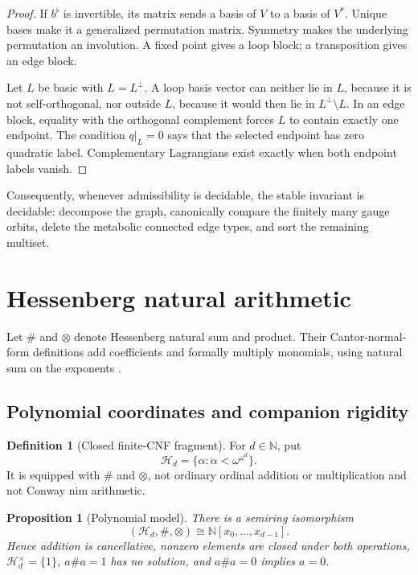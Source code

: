 \documentclass[11pt]{article}
\newtheorem{proposition}[theorem]{Proposition}
\theoremstyle{definition}
\newtheorem{definition}[theorem]{Definition}
\theoremstyle{remark}
\newcommand{\Nat}{\mathbb N}
\newcommand{\Hess}{\mathcal H}
\begin{document}
\begin{proof}
If \(b^\flat\) is invertible, its matrix sends a basis of \(V\) to a basis of
\(V^*\).  Unique bases make it a generalized permutation matrix.  Symmetry
makes the underlying permutation an involution.  A fixed point gives a loop
block; a transposition gives an edge block.

Let \(L\) be basic with \(L=L^\perp\).  A loop basis vector can neither lie in
\(L\), because it is not self-orthogonal, nor outside \(L\), because it would
then lie in \(L^\perp\setminus L\).  In an edge block, equality with the
orthogonal complement forces \(L\) to contain exactly one endpoint.  The
condition \(q|_L=0\) says that the selected endpoint has zero quadratic label.
Complementary Lagrangians exist exactly when both endpoint labels vanish.
\end{proof}

Consequently, whenever admissibility is decidable, the stable invariant is
decidable: decompose the graph, canonically compare the finitely many gauge
orbits, delete the metabolic connected edge types, and sort the remaining
multiset.

\section{Hessenberg natural arithmetic}\label{sec:hessenberg}

Let \(\#\) and \(\otimes\) denote Hessenberg natural sum and product.  Their
Cantor-normal-form definitions add coefficients and formally multiply
monomials, using natural sum on the exponents \cite{carruth1942}.

\subsection{Polynomial coordinates and companion rigidity}

\begin{definition}[Closed finite-CNF fragment]
For \(d\in\Nat\), put
\[
 \Hess_d=\{\alpha:\alpha<\omega^{\omega^d}\}.
\]
It is equipped with \(\#\) and \(\otimes\), not ordinary ordinal addition or
multiplication and not Conway nim arithmetic.
\end{definition}

\begin{proposition}[Polynomial model]\label{prop:polynomial}
There is a semiring isomorphism
\[
 (\Hess_d,\#,\otimes)\cong\Nat[x_0,\ldots,x_{d-1}].
\]
Hence addition is cancellative, nonzero elements are closed under both
operations, \(\Hess_d^\times=\{1\}\), \(a\#a=1\) has no solution, and
\(a\#a=0\) implies \(a=0\).
\end{proposition}
\end{document}
